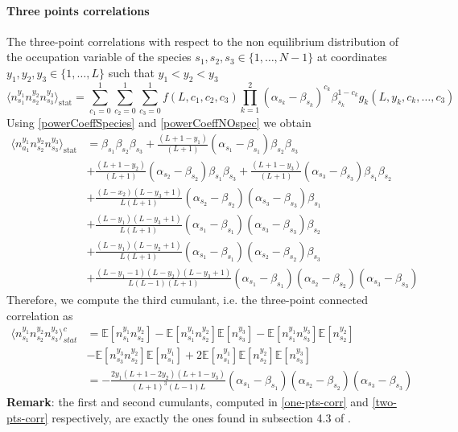 \documentclass[10pt]{article}
\numberwithin{equation}{section}
\numberwithin{equation}{subsection}
\begin{document}
\paragraph{Three points correlations}
The three-point correlations with respect to the non equilibrium distribution of the occupation variable of the species $s_{1},s_{2},s_{3}\in \{1,\ldots,N-1\}$ at coordinates $y_{1},y_{2},y_{3}\in \{1,\ldots,L\}$ such that $y_{1}<y_{2}<y_{3}$
\begin{equation}
    \langle n_{s_{1}}^{y_{1}}n_{s_{2}}^{y_{2}}n_{s_{3}}^{y_{3}}\rangle_{\text{stat}}=\sum_{c_{1}=0}^{1}\sum_{c_{2}=0}^{1}\sum_{c_{3}=0}^{1}f(L,c_{1},c_{2},c_{3})\prod_{k=1}^{2}(\alpha_{s_{k}}-\beta_{s_{k}})^{c_{k}}\beta_{s_{k}}^{1-c_{k}}g_{k}(L,y_{k},c_{k},\ldots,c_{3})
\end{equation}
Using \eqref{powerCoeffSpecies} and \eqref{powerCoeffNOspec} we obtain 
\begin{align}\label{three-pts-corr}
        \langle n_{a_{1}}^{y_{1}}n_{s_{2}}^{y_{2}}n_{s_{3}}^{y_{3}}\rangle_{\text{stat}}&=\beta_{s_{1}}\beta_{s_{2}}\beta_{s_{3}}+\frac{(L+1-y_{1})}{(L+1)}(\alpha_{s_{1}}-\beta_{s_{1}})\beta_{s_{2}}\beta_{s_{3}}
        \\&+\nonumber
        \frac{(L+1-y_{2})}{(L+1)}(\alpha_{s_{2}}-\beta_{s_{2}})\beta_{s_{1}}\beta_{s_{3}}+\frac{(L+1-y_{3})}{(L+1)}(\alpha_{s_{3}}-\beta_{s_{3}})\beta_{s_{1}}\beta_{s_{2}}
        \\&+\nonumber
        \frac{(L-x_{2})(L-y_{3}+1)}{L(L+1)}(\alpha_{s_{2}}-\beta_{s_{2}})(\alpha_{s_{3}}-\beta_{s_{3}})\beta_{s_{1}}
        \\&+\nonumber
        \frac{(L-y_{1})(L-y_{3}+1)}{L(L+1)}(\alpha_{s_{1}}-\beta_{s_{1}})(\alpha_{s_{3}}-\beta_{s_{3}})\beta_{s_{2}}
        \\&+\nonumber
        \frac{(L-y_{1})(L-y_{2}+1)}{L(L+1)}(\alpha_{s_{1}}-\beta_{s_{1}})(\alpha_{s_{2}}-\beta_{s_{2}})\beta_{s_{3}}
        \\&+\nonumber
        \frac{(L-y_{1}-1)(L-y_{2})(L-y_{3}+1)}{L(L-1)(L+1)}(\alpha_{s_{1}}-\beta_{s_{1}})(\alpha_{s_{2}}-\beta_{s_{2}})(\alpha_{s_{3}}-\beta_{s_{3}})
\end{align}
Therefore, we compute the third cumulant, i.e. the three-point connected correlation as 
\begin{align}
	\langle n_{s_{1}}^{y_{1}}n_{s_{2}}^{y_{2}}n_{s_{3}}^{y_{3}}\rangle_{stat}^{c}&=\mathbb{E}\left[n_{s_{1}}^{y_{1}}n_{s_{2}}^{y_{2}}\right]-\mathbb{E}\left[n_{s_{1}}^{y_{1}}n_{s_{2}}^{y_{2}}\right]\mathbb{E}\left[n_{s_{3}}^{y_{3}}\right]-\mathbb{E}\left[n_{s_{1}}^{y_{1}}n_{s_{3}}^{y_{3}}\right]\mathbb{E}\left[n_{s_{2}}^{y_{2}}\right]\\&-\mathbb{E}\left[n_{s_{3}}^{y_{3}}n_{s_{2}}^{y_{2}}\right]\mathbb{E}\left[n_{s_{1}}^{y_{1}}\right]+2\mathbb{E}\left[n_{s_{1}}^{y_{1}}\right]\mathbb{E}\left[n_{s_{2}}^{y_{2}}\right]\mathbb{E}\left[n_{s_{3}}^{y_{3}}\right]
	\\&=
	-\frac{2y_{1}(L+1-2y_{2})(L+1-y_{3})}{(L+1)^{3}(L-1)L}(\alpha_{s_{1}}-\beta_{s_{1}})(\alpha_{s_{2}}-\beta_{s_{2}})(\alpha_{s_{3}}-\beta_{s_{3}})
\end{align}
\textbf{Remark}: the first and second cumulants, computed in \eqref{one-pts-corr} and \eqref{two-pts-corr} respectively, are exactly the ones found in subsection 4.3 of \cite{vanicat2017exact}. 
\end{document}
